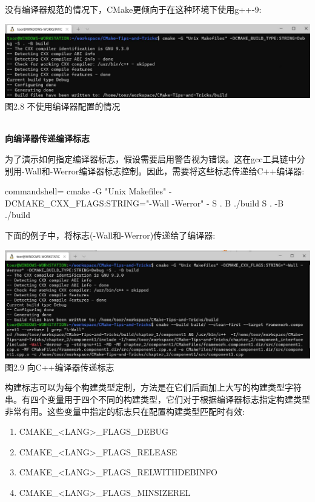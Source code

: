 没有编译器规范的情况下，CMake更倾向于在这种环境下使用g++-9:

\begin{center}
\includegraphics[width=1.\textwidth]{content/1/chapter2/images/8.jpg}\\
图2.8 不使用编译器配置的情况
\end{center}

\hspace*{\fill} \\ %
\noindent
\textbf{向编译器传递编译标志}

为了演示如何指定编译器标志，假设需要启用警告视为错误。这在gcc工具链中分别用-Wall和-Werror编译器标志控制。因此，需要将这些标志传递给C++编译器:

\begin{tcblisting}{commandshell={}}
cmake -G "Unix Makefiles" -DCMAKE_CXX_FLAGS:STRING="-Wall
  -Werror" - S . B ./build S . -B ./build
\end{tcblisting}

下面的例子中，将标志(-Wall和-Werror)传递给了编译器:

\begin{center}
\includegraphics[width=1.\textwidth]{content/1/chapter2/images/9.jpg}\\
图2.9 向C++编译器传递标志
\end{center}

构建标志可以为每个构建类型定制，方法是在它们后面加上大写的构建类型字符串。有四个变量用于四个不同的构建类型，它们对于根据编译器标志指定构建类型非常有用。这些变量中指定的标志只在配置构建类型匹配时有效:

\begin{enumerate}
\item 
CMAKE\_<LANG>\_FLAGS\_DEBUG

\item 
CMAKE\_<LANG>\_FLAGS\_RELEASE

\item 
CMAKE\_<LANG>\_FLAGS\_RELWITHDEBINFO

\item 
CMAKE\_<LANG>\_FLAGS\_MINSIZEREL
\end{enumerate}

